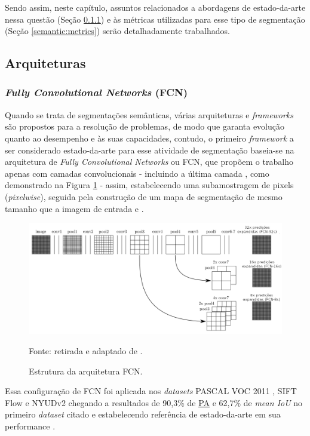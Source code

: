 Sendo assim, neste capítulo, assuntos relacionados a abordagens de estado-da-arte nessa questão (Seção \ref{semantic:FCN}) e às métricas utilizadas para esse tipo de segmentação (Seção \ref{semantic:metrics}) serão detalhadamente trabalhados.


\subsection{Arquiteturas}


\subsubsection{\textit{Fully Convolutional Networks} (FCN)}
\label{semantic:FCN}
Quando se trata de segmentações semânticas, várias arquiteturas e \textit{frameworks} são propostos para a resolução de problemas, de modo que garanta evolução quanto ao desempenho e às suas capacidades, contudo, o primeiro \textit{framework} a ser considerado estado-da-arte para esse atividade de segmentação baseia-se na arquitetura de \textit{Fully Convolutional Networks} \citep{Shelhamer2016} ou FCN, que propõem o trabalho apenas com camadas convolucionais - incluindo a última camada \citep{Hesamian2019}, como demonstrado na Figura \ref{semantic:fig:5} - assim, estabelecendo uma subamostragem de pixels (\textit{pixelwise}), seguida pela construção de um mapa de segmentação de mesmo tamanho que a imagem de entrada \citep{Minaee2021, Zhang2018} e \citep{Hesamian2019}.

\begin{figure}[H]
    \centering
    \caption{Estrutura da arquitetura FCN.}
    \includegraphics[width=1\linewidth]{recursos/imagens/semantic/fcn_arch.png}
    \label{semantic:fig:5}

    Fonte: retirada e adaptado de \cite{Shelhamer2016}.
\end{figure}

\begin{sloppypar}
Essa configuração de FCN foi aplicada nos \textit{datasets} PASCAL VOC 2011 \citep{everingham2010pascal}, SIFT Flow \citep{Liu2011} e NYUDv2 \citep{Silberman:ECCV12} chegando a resultados de 90,3\% de \hyperref[semantic:pa]{PA} e 62,7\% de \textit{mean IoU} no primeiro \textit{dataset} citado \citep{Ghosh2019} e estabelecendo referência de estado-da-arte em sua performance \citep{Minaee2021}.
\end{sloppypar}

